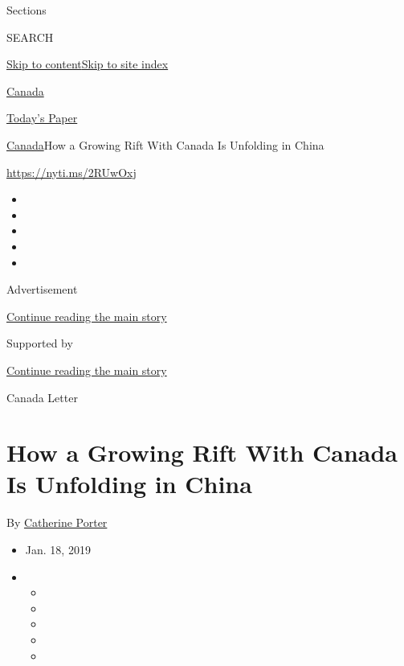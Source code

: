 Sections

SEARCH

\protect\hyperlink{site-content}{Skip to
content}\protect\hyperlink{site-index}{Skip to site index}

\href{https://www.nytimes.com/section/world/canada}{Canada}

\href{https://myaccount.nytimes.com/auth/login?response_type=cookie\&client_id=vi}{}

\href{https://www.nytimes.com/section/todayspaper}{Today's Paper}

\href{/section/world/canada}{Canada}\textbar{}How a Growing Rift With
Canada Is Unfolding in China

\url{https://nyti.ms/2RUwOxj}

\begin{itemize}
\item
\item
\item
\item
\item
\end{itemize}

Advertisement

\protect\hyperlink{after-top}{Continue reading the main story}

Supported by

\protect\hyperlink{after-sponsor}{Continue reading the main story}

Canada Letter

\hypertarget{how-a-growing-rift-with-canada-is-unfolding-in-china}{%
\section{How a Growing Rift With Canada Is Unfolding in
China}\label{how-a-growing-rift-with-canada-is-unfolding-in-china}}

By \href{https://www.nytimes.com/by/catherine-porter}{Catherine Porter}

\begin{itemize}
\item
  Jan. 18, 2019
\item
  \begin{itemize}
  \item
  \item
  \item
  \item
  \item
  \end{itemize}
\end{itemize}

